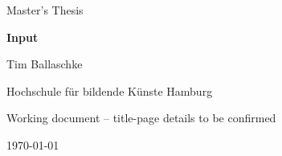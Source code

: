 \documentclass[12pt,a4paper]{article}
\begin{document}
\hypersetup{pageanchor=false}
\begin{titlepage}
  \centering
  \vspace*{0.18\textheight}
  {\Large Master's Thesis\par}
  \vspace{1.5cm}
  {\Huge\bfseries Input\par}
  \vspace{2cm}
  {\large Tim Ballaschke\par}
  \vfill
  {\large Hochschule für bildende Künste Hamburg\par}
  \vspace{0.5cm}
  {\small Working document -- title-page details to be confirmed\par}
  \vspace{1cm}
  {\large \today\par}
\end{titlepage}

\hypersetup{pageanchor=true}
\tableofcontents
\clearpage
{}



\clearpage
\nocite{aiCollaborationDocumentation2026}
\printbibliography[heading=bibintoc,title={Bibliography}]
\end{document}

